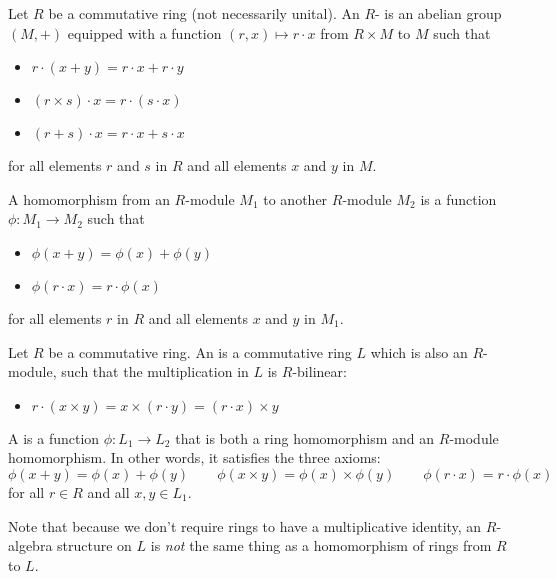 \begin{definition}
Let $R$ be a commutative ring (not necessarily unital). An $R$- is an abelian group $(M, +)$ equipped with a function $(r, x) \mapsto r\cdot x$ from $R \times M$ to $M$ such that
\begin{itemize}
\item $r \cdot (x+y) = r \cdot x + r \cdot y$
\item $(r \times s) \cdot x = r \cdot (s \cdot x)$
\item $ (r+s) \cdot x = r \cdot x + s \cdot x$
\end{itemize}
for all elements $r$ and $s$ in $R$ and all elements $x$ and $y$ in $M$.

A homomorphism from an $R$-module $M_1$ to another $R$-module $M_2$ is a function $\phi : M_1 \to M_2$ such that 
\begin{itemize}
\item $\phi(x+y) = \phi(x) + \phi(y)$
\item $\phi(r \cdot x) = r \cdot \phi(x)$
\end{itemize}
for all elements $r$ in $R$ and all elements $x$ and $y$ in $M_1$.

\end{definition}


\begin{definition}
Let $R$ be a commutative ring. An  is a commutative ring $L$ which is also an $R$-module, such that the multiplication in $L$ is $R$-bilinear:
\begin{itemize}
\item $ r\cdot(x \times y) = x \times (r \cdot y) = (r \cdot x) \times y  $
\end{itemize}
A  is a function $\phi: L_1 \to L_2$ that is both a ring homomorphism and an $R$-module homomorphism. In other words, it satisfies the three axioms:
$$ \phi(x+y) = \phi(x) + \phi(y) \qquad \phi(x \times y) = \phi(x) \times \phi(y)  \qquad \phi(r \cdot x) = r  \cdot \phi(x)$$
for all $r \in R$ and all $x, y \in L_1$.

\end{definition}

\begin{remark}
Note that because we don't require rings to have a multiplicative identity, an $R$-algebra structure on $L$ is \emph{not} the same thing as a homomorphism of rings from $R$ to $L$. 
\end{remark}


